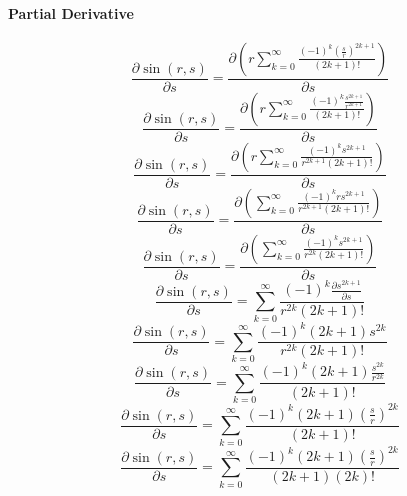 \documentclass[a4paper,12pt]{report}
\begin{document}
\paragraph{Partial Derivative}
\begin{equation}
\frac{\partial \sin(r,s)}{\partial s} = \frac{\partial \left(r \sum \limits_{k=0}^{\infty} \frac{(-1)^k \left(\frac{s}{r}\right)^{2k+1}}{(2k+1)!}\right)}{\partial s}
\end{equation}
\begin{equation}
\frac{\partial \sin(r,s)}{\partial s} = \frac{\partial \left(r \sum \limits_{k=0}^{\infty} \frac{(-1)^k \frac{s^{2k+1}}{r^{2k+1}}}{(2k+1)!}\right)}{\partial s}
\end{equation}
\begin{equation}
\frac{\partial \sin(r,s)}{\partial s} = \frac{\partial \left(r \sum \limits_{k=0}^{\infty} \frac{(-1)^k s^{2k+1}}{r^{2k+1} (2k+1)!}\right)}{\partial s}
\end{equation}
\begin{equation}
\frac{\partial \sin(r,s)}{\partial s} = \frac{\partial \left(\sum \limits_{k=0}^{\infty} \frac{(-1)^k rs^{2k+1}}{r^{2k+1} (2k+1)!}\right)}{\partial s}
\end{equation}
\begin{equation}
\frac{\partial \sin(r,s)}{\partial s} = \frac{\partial \left(\sum \limits_{k=0}^{\infty} \frac{(-1)^k s^{2k+1}}{r^{2k} (2k+1)!}\right)}{\partial s}
\end{equation}
\begin{equation}
\frac{\partial \sin(r,s)}{\partial s} = \sum \limits_{k=0}^{\infty} \frac{(-1)^k \frac{\partial s^{2k+1}}{\partial s}}{r^{2k} (2k+1)!}
\end{equation}
\begin{equation}
\frac{\partial \sin(r,s)}{\partial s} = \sum \limits_{k=0}^{\infty} \frac{(-1)^k (2k+1) s^{2k}}{r^{2k} (2k+1)!}
\end{equation}
\begin{equation}
\frac{\partial \sin(r,s)}{\partial s} = \sum \limits_{k=0}^{\infty} \frac{(-1)^k (2k+1) \frac{s^{2k}}{r^{2k}}}{(2k+1)!}
\end{equation}
\begin{equation}
\frac{\partial \sin(r,s)}{\partial s} = \sum \limits_{k=0}^{\infty} \frac{(-1)^k (2k+1) \left(\frac{s}{r}\right)^{2k}}{(2k+1)!}
\end{equation}
\begin{equation}
\frac{\partial \sin(r,s)}{\partial s} = \sum \limits_{k=0}^{\infty} \frac{(-1)^k (2k+1) \left(\frac{s}{r}\right)^{2k}}{(2k+1) (2k)!}
\end{equation}
\end{document}
